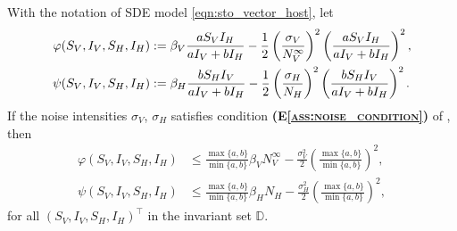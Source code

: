 %
%
%
%
\begin{proposition}\label{prp:quadratic_bound}
    With the notation of SDE model \eqref{eqn:sto_vector_host},
    let
    \begin{equation}
        \begin{aligned}
            \varphi (S_V, I_V, S_H, I_H) &:= 
                \beta_V
                 \frac{a S_V I_H}{a I_V + b I_H}
                - 
                \frac{1}{2}
                \left(
                    \frac{\sigma_V }{N_V^\infty} 
                \right) ^ 2
                \left(
                    \frac{ a S_V I_H}{a I_V + b I_H}
                \right) ^2,
            \\
            \psi (S_V, I_V, S_H, I_H) &:=
                \beta_H 
                \frac{
                    b S_H  I_V
                }{%
                    a I_V + b I_H
                }
                - 
                \frac{1}{2}
                \left(
                    \frac{\sigma_H}{ N_H } 
                \right) ^ 2
                    \left(
                        \frac{
                            b S_H  I_V
                        }{
                            a I_V + b I_H
                        }
                    \right) ^ 2.
        \end{aligned}
    \end{equation}
    If the noise intensities $\sigma_V$, $\sigma_H$ satisfies condition 
    \textsc{
        \textbf{(E\textendash\ref{ass:noise_condition})}
    }
    of , then
    \begin{equation}
        \label{eqn:max_min_bounds}
        \begin{aligned}
            \varphi (S_V, I_V, S_H, I_H)            
            & \leq 
                \frac{
                    \max\{a,b\}
                }{
                    \min \{a, b\}
                }
                    \beta_{V}
                  N_V ^ {\infty}
                - 
                \frac{\sigma_V ^ 2}{2}
                \left(
                    \frac{
                        \max\{a,b\}
                    }{
                        \min \{a, b\}
                    }
                \right) ^ 2,
            \\
            \psi (S_V, I_V, S_H, I_H)            
            & \leq
                \frac{
                    \max\{a,b\}
                }{
                    \min \{a, b\}
                }
                \beta_H  N_H - \frac{\sigma_H ^ 2}{2}
                    \left(
                        \frac{
                            \max\{a,b\}
                        }{
                            \min \{a, b\}
                        }
                  \right) ^ 2,
        \end{aligned}
    \end{equation}
    for all $(S_V, I_V, S_H, I_H)           ^{\top}$ in the invariant set 
    $\mathbb{D}$.
\end{proposition}
